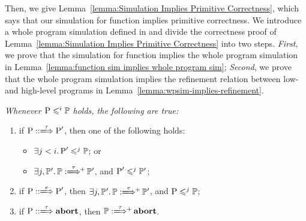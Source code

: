 {Then, we give  
Lemma~\ref{lemma:Simulation Implies Primitive Correctness}, 
which says that our simulation for function implies 
primitive correctness. We introduce a whole program 
simulation defined in \Def{\ref{def:wpsim}} and divide 
the correctness proof of 
Lemma~\ref{lemma:Simulation Implies Primitive Correctness}
into two steps.
\textit{First}, we prove 
that the simulation for function implies 
the whole program simulation in 
Lemma~\ref{lemma:function sim implies whole program sim}; 
\textit{Second}, we prove that 
the whole program simulation implies the refinement relation 
between low- and high-level programs in
Lemma~\ref{lemma:wpsim-implies-refinement}. 
\begin{definition}
    \label{def:wpsim}
    \em
    Whenever $\text{P} \leqslant^{i} \mathbb{P}$ holds, 
    the following are true:
    \begin{enumerate}[1.]
        \small
        \item if $\LGlobTrans{\prog}{\tau}{\prog'}$, 
            then one of the following holds:
            \begin{itemize}
                \item $\exists j < i. \, 
                    \text{P}' \leqslant^{j} \mathbb{P}$; or 
                \item $\exists j, \HProg'. \, 
                    \HGlobMultiTrans{\HProg}{\tau}{+}{\HProg'}$, 
                    and $\text{P}' \leqslant^{j} \mathbb{P}'$;
            \end{itemize}
        \item if $\LGlobTrans{\prog}{\event}{\prog'}$, 
            then $\exists j, \HProg'. \, 
            \HGlobMultiTrans{\HProg}{\event}{+}{\HProg'}$,
            and $\text{P} \leqslant^{j} \mathbb{P}$; 
        \item if $\LGlobTrans{\prog}{\tau}{\evtabort}$, 
            then $\HGlobMultiTrans{\HProg}{\tau}{+}{\evtabort}$.
    \end{enumerate}
\end{definition}

}

